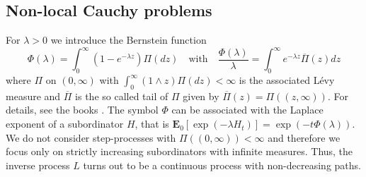 \documentclass[[11pt,a4paper,reqno]{article}
\numberwithin{equation}{section}
\begin{document}
\subsection{Non-local Cauchy problems}

For $\lambda>0$ we introduce the Bernstein function 
\begin{equation}
\Phi(\lambda) = \int_0^\infty \left( 1 - e^{ - \lambda z} \right) \Pi(dz) \quad \textrm{with} \quad \frac{\Phi(\lambda)}{\lambda} = \int_0^\infty e^{-\lambda z} \overline{\Pi}(z)dz
\label{Symbol}
\end{equation} 
where $\Pi$ on $(0, \infty)$ with $\int_0^\infty (1 \wedge z) \Pi(dz) < \infty$ is the associated L\'evy measure and $\overline{\Pi}$ is the so called tail of $\Pi$ given by $\overline{\Pi}(z) = \Pi((z, \infty))$. For details, see the books  \cite{Ber96, BerBook}. The symbol $\Phi$ can be associated with the Laplace exponent of a subordinator $H$, that is $\mathbf{E}_0[\exp( - \lambda H_t)] = \exp(- t \Phi(\lambda))$. We do not consider step-processes with $\Pi((0, \infty)) < \infty$ and therefore we focus only on strictly increasing subordinators with infinite measures. Thus, the inverse process $L$ turns out to be a continuous process with non-decreasing paths. 
\end{document}
